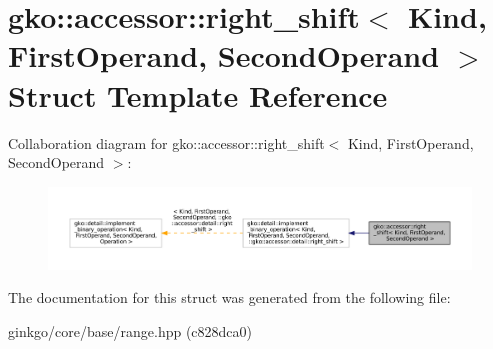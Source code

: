 \hypertarget{structgko_1_1accessor_1_1right__shift}{}\section{gko\+:\+:accessor\+:\+:right\+\_\+shift$<$ Kind, First\+Operand, Second\+Operand $>$ Struct Template Reference}
\label{structgko_1_1accessor_1_1right__shift}


Collaboration diagram for gko\+:\+:accessor\+:\+:right\+\_\+shift$<$ Kind, First\+Operand, Second\+Operand $>$\+:
\nopagebreak
\begin{figure}[H]
\begin{center}
\leavevmode
\includegraphics[width=350pt]{structgko_1_1accessor_1_1right__shift__coll__graph}
\end{center}
\end{figure}


The documentation for this struct was generated from the following file\+:\begin{DoxyCompactItemize}
\item 
ginkgo/core/base/range.\+hpp (c828dca0)\end{DoxyCompactItemize}
